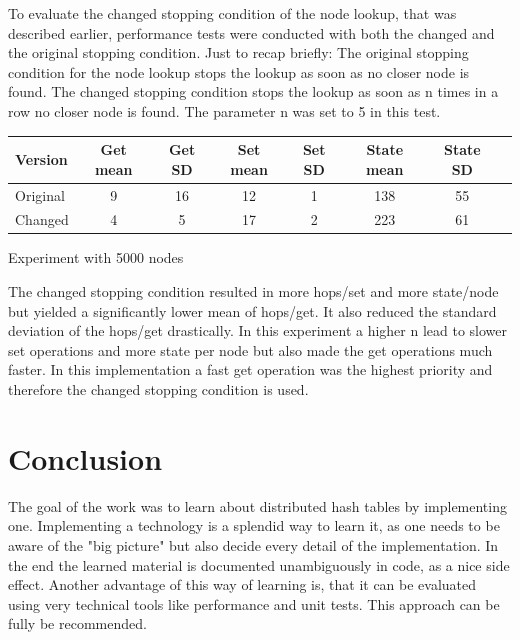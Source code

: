 \documentclass[a4paper, 12pt]{article} %
\begin{document}
\clearpage

To evaluate the changed stopping condition of the node lookup, that was described earlier, performance tests were conducted with both the changed and the original stopping condition. Just to recap briefly: The original stopping condition for the node lookup stops the lookup as soon as no closer node is found. The changed stopping condition stops the lookup as soon as n times in a row no closer node is found. The parameter n was set to 5 in this test. 

\begin{table}[h]
\centering
\begin{tabular}{l*{6}{c}r}
Version           & Get mean & Get SD & Set mean & Set SD & State mean & State SD \\
\hline
Original          & 9        & 16     & 12       & 1      & 138        & 55       \\
Changed           & 4        & 5      & 17       & 2      & 223        & 61       \\
\end{tabular}
  \begin{tablenotes}
    \small
    \item Experiment with 5000 nodes
  \end{tablenotes}
\end{table}

The changed stopping condition resulted in more hops/set and more state/node but yielded a significantly lower mean of hops/get. It also reduced the standard deviation of the hops/get drastically. In this experiment a higher n lead to slower set operations and more state per node but also made the get operations much faster. In this implementation a fast get operation was the highest priority and therefore the changed stopping condition is used.

\newpage
\section{Conclusion}


The goal of the work was to learn about distributed hash tables by implementing one. Implementing a technology is a splendid way to learn it, as one needs to be aware of the "big picture" but also decide every detail of the implementation. In the end the learned material is documented unambiguously in code, as a nice side effect. Another advantage of this way of learning is, that it can be evaluated using very technical tools like performance and unit tests. This approach can be fully be recommended.
\end{document}
